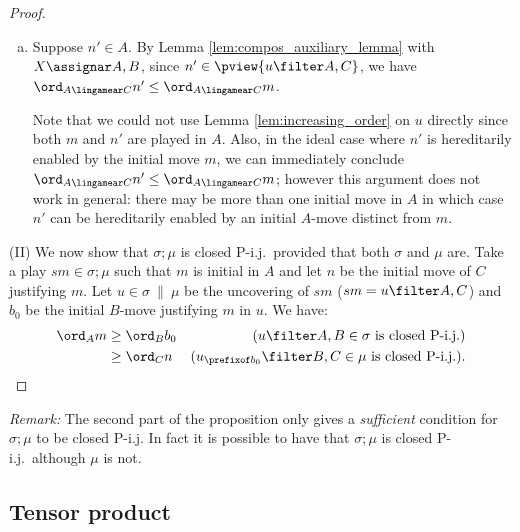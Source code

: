 \begin{proof}
\begin{enumerate}[1)]
\begin{itemize}[-]
\begin{enumerate}[a.]
            \item Suppose $n'\in A$.
By Lemma \ref{lem:compos_auxiliary_lemma} with $X
\assignar A,B$, since $n' \in \pview{u \filter A,C}$, we
have $\ord_{A\lingamear C} n' \leq \ord_{A\lingamear C}
m$.
\smallskip

        Note that we could not use Lemma
        \ref{lem:increasing_order} on $u$ directly since
        both $m$ and $n'$ are played in $A$. Also, in
        the ideal case where $n'$ is hereditarily
        enabled by the initial move $m$, we can
        immediately conclude $\ord_{A\lingamear C} n'
        \leq \ord_{A\lingamear C} m$; however this
        argument does not work in general: there may be
        more than one initial move in $A$ in which case
        $n'$ can be hereditarily enabled by an initial
        $A$-move distinct from $m$.
            \end{enumerate}
        \end{itemize}

    \end{enumerate}

\noindent (II) We now show that $\sigma;\mu$ is closed P-i.j.\
provided that both $\sigma$ and $\mu$ are. Take a play $s m \in
\sigma ; \mu$ such that $m$ is initial in $A$ and let $n$ be the
initial move of $C$ justifying $m$. Let $u \in \sigma \ \|\ \mu$ be
the uncovering of $s m$ ($s m = u \filter A,C$) and $b_0$ be the
initial $B$-move justifying $m$ in $u$.
 We have:
\begin{align*}
\ord_A m & \geq \ord_B b_0 & \mbox{($u \filter A,B \in \sigma$ is closed P-i.j.)} \\
 & \geq \ord_C n & \mbox{($u_{\prefixof b_0} \filter B,C \in \mu $ is closed P-i.j.)}.
\end{align*}
\end{proof}

{\it Remark:} The second part of the proposition only gives a
\emph{sufficient} condition for $\sigma ; \mu$ to be closed P-i.j.
In fact it is possible to have that $\sigma ; \mu$ is closed P-i.j.\
although $\mu$ is not.


\subsection{Tensor product}

